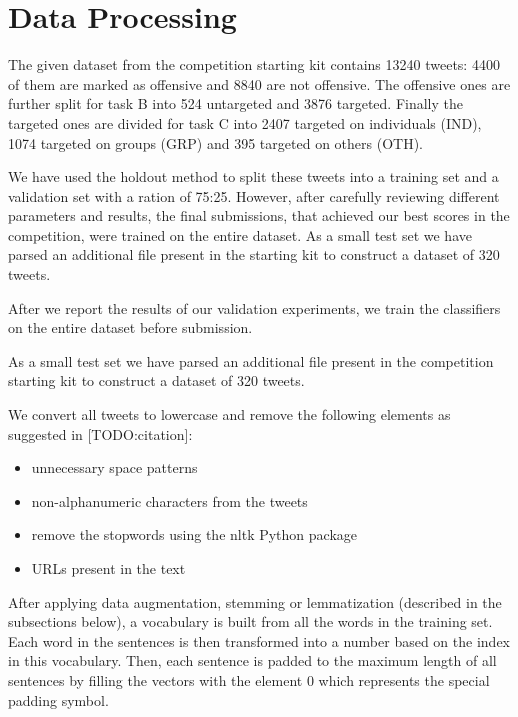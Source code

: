 \documentclass[11pt,a4paper]{article}
\begin{document}

\section{Data Processing}



The given dataset from the competition starting kit contains 13240 tweets: 4400 of them are marked as offensive and 8840 are not offensive. The offensive ones are further split for task B into 524 untargeted and 3876 targeted. Finally the targeted ones are divided for task C into 2407 targeted on individuals (IND), 1074 targeted on groups (GRP) and 395 targeted on others (OTH).

We have used the holdout method to split these tweets into a training set and a validation set with a ration of 75:25. However, after carefully reviewing different parameters and results, the final submissions, that achieved our best scores in the competition, were trained on the entire dataset. As a small test set we have parsed an additional file present in the starting kit to construct a dataset of 320 tweets.

After we report the results of our validation experiments, we train the classifiers on the entire dataset before submission.

As a small test set we have parsed an additional file present in the competition starting kit to construct a dataset of 320 tweets.

We convert all tweets to lowercase and remove the following elements as suggested in [TODO:citation]:
\begin{itemize}
    \item unnecessary space patterns
    \item non-alphanumeric characters from the tweets
    \item remove the stopwords using the nltk Python package
    \item URLs present in the text
\end{itemize}

After applying data augmentation, stemming or lemmatization (described in the subsections below), a vocabulary is built from all the words in the training set. Each word in the sentences is then transformed into a number based on the index in this vocabulary. Then, each sentence is padded to the maximum length of all sentences by filling the vectors with the element 0 which represents the special padding symbol.
\end{document}
